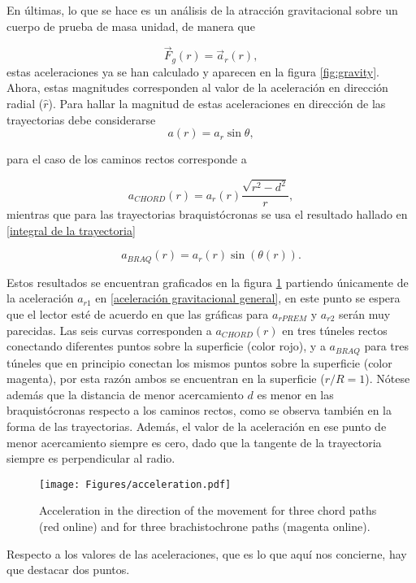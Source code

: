 \documentclass[aps,twocolumn,showpacs,preprintnumbers]{revtex4}
\begin{document}
        En últimas, lo que se hace es un análisis de la atracción gravitacional sobre un cuerpo de prueba de masa unidad, de manera que 
   
        \[ \Vec{F}_g (r) = \Vec{a}_r (r) ,\]
        estas aceleraciones ya se han calculado y aparecen en la figura \ref{fig:gravity}. Ahora, estas magnitudes corresponden al valor de la aceleración en dirección radial ($\hat{r}$). Para hallar la magnitud de estas aceleraciones en dirección de las trayectorias debe considerarse
        \[ a(r) = a_r \sin{\theta} ,\]
    
        para el caso de los caminos rectos corresponde a
    
        \[ a_{CHORD}(r) = a_r(r) \frac{\sqrt{r^2 - d^2}}{r}, \]
        mientras que para las trayectorias braquistócronas se usa el resultado hallado en \eqref{integral de la trayectoria}
        
        \[ a_{BRAQ}(r) = a_r(r) \sin{\left(\theta(r)\right)}. \]
        
        
        Estos resultados se encuentran graficados en la figura \ref{fig:a-chord and a-braq} partiendo únicamente de la aceleración $a_{r 1}$ en \eqref{aceleración gravitacional general}, en este punto se espera que el lector esté de acuerdo en que las gráficas para $a_{r PREM}$ y $a_{r 2}$ serán muy parecidas. Las seis curvas corresponden a $a_{CHORD}(r)$ en tres túneles rectos conectando diferentes puntos sobre la superficie (color rojo), y a $a_{BRAQ}$ para tres túneles que en principio conectan los mismos puntos sobre la superficie (color magenta), por esta razón ambos se encuentran en la superficie ($r/R=1$). Nótese además que la distancia de menor acercamiento $d$ es menor en las braquistócronas respecto a los caminos rectos, como se observa también en la forma de las trayectorias. Además, el valor de la aceleración en ese punto de menor acercamiento siempre es cero, dado que la tangente de la trayectoria siempre es perpendicular al radio.
        
        
        \begin{figure}
            \centering
            \texttt{[image: Figures/acceleration.pdf]}
            \caption{Acceleration in the direction of the movement for three chord paths (red online) and for three brachistochrone  paths (magenta online).}
            \label{fig:a-chord and a-braq}
        \end{figure}
        
        Respecto a los valores de las aceleraciones, que es lo que aquí nos concierne, hay que destacar dos puntos.
        
\end{document}
